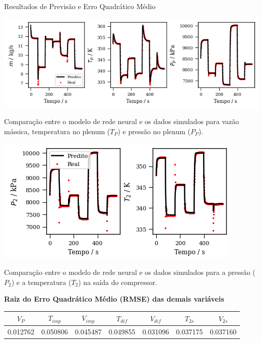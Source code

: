 \begin{frame}{Resultados de Previsão e Erro Quadrático Médio}
\scriptsize

\begin{center}
\setlength{\fboxsep}{0pt}%
\begin{minipage}[t]{0.49\textwidth}
    \centering
    \includegraphics[width=1.05\linewidth, height=0.40\textheight, keepaspectratio]{figures/plot_1.png}
    \vspace{0.1cm}
    {\tiny\parbox{\linewidth}{\centering Comparação entre o modelo de rede neural e os dados simulados para vazão mássica, temperatura no plenum ($T_P$) e pressão no plenum ($P_P$).}}
\end{minipage}\hfill
\begin{minipage}[t]{0.49\textwidth}
    \centering
    \includegraphics[width=1.1\linewidth, height=0.4\textheight, keepaspectratio]{figures/plot_2.png}
    \vspace{0.1cm}
    {\tiny\parbox{\linewidth}{\centering Comparação entre o modelo de rede neural e os dados simulados para a pressão ($P_2$) e a temperatura ($T_2$) na saída do compressor.}}
\end{minipage}
\end{center}

\vspace{0.2cm}

\centering
\textbf{Raiz do Erro Quadrático Médio (RMSE) das demais variáveis} \\[0.2cm]

\begin{tabular}{@{}ccccccc@{}}
\toprule
$V_P$ & $T_{imp}$ & $V_{imp}$ & $T_{dif}$ & $V_{dif}$ & $T_{2s}$ & $V_{2s}$ \\
\midrule
0.012762 & 0.050806 & 0.045487 & 0.049855 & 0.031096 & 0.037175 & 0.037160 \\
\bottomrule
\end{tabular}

\end{frame}

